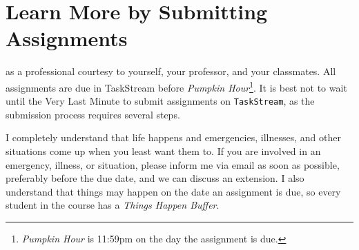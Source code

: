 \section{Learn More by Submitting Assignments}
 as a professional courtesy to yourself, your professor, and your classmates. All assignments are due in TaskStream before \textit{Pumpkin Hour}\footnote{\textit{Pumpkin Hour} is 11:59pm on the day the assignment is due.}. It is best not to wait until the Very Last Minute to submit assignments on \texttt{TaskStream}, as the submission process requires several steps.

I completely understand that life happens and emergencies, illnesses, and other situations come up when you least want them to. If you are involved in an emergency, illness, or situation, please inform me via email as soon as possible, preferably before the due date, and we can discuss an extension. I also understand that things may happen on the date an assignment is due, so every student in the course has a \textit{Things Happen Buffer}.
